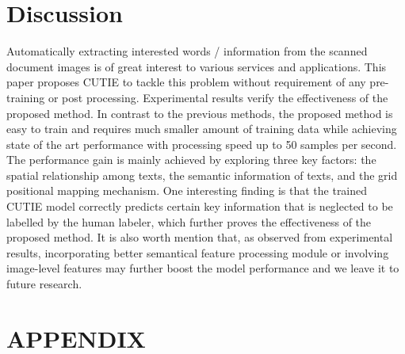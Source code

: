 \documentclass[10pt,twocolumn,letterpaper]{article}
\begin{document}
\section{Discussion}
Automatically extracting interested words / information from the scanned document images is of great interest to various services and applications. This paper proposes CUTIE to tackle this problem without requirement of any pre-training or post processing. Experimental results verify the effectiveness of the proposed method. In contrast to the previous methods, the proposed method is easy to train and requires much smaller amount of training data while achieving state of the art performance with processing speed up to 50 samples per second. The performance gain is mainly achieved by exploring three key factors: the spatial relationship among texts, the semantic information of texts, and the grid positional mapping mechanism. One interesting finding is that the trained CUTIE model correctly predicts certain key information that is neglected to be labelled by the human labeler, which further proves the effectiveness of the proposed method. It is also worth mention that, as observed from experimental results, incorporating better semantical feature processing module or involving image-level features may further boost the model performance and we leave it to future research.

{\small


}

\section{APPENDIX}
\end{document}
